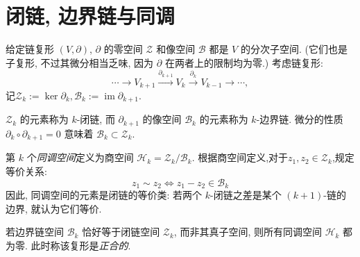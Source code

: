 \section{闭链, 边界链与同调}\label{sec:cycles-boundaries-homology}

给定链复形 $(V,\partial)$, $\partial$ 的零空间 $\mathcal Z$ 和像空间 $\mathcal B$ 都是 $V$ 的分次子空间. (它们也是子复形, 不过其微分相当乏味, 因为 $\partial$ 在两者上的限制均为零.) 
考虑链复形:
\[
\cdots\to V_{k+1}\xrightarrow{\partial_{k+1}}V_k\xrightarrow{\partial_k}V_{k-1}\to\cdots,
\]
记$\mathcal Z_k:=\ker \partial_{k},\mathcal B_k:=\operatorname{im}\partial_{k+1}$.

$\mathcal Z_k$ 的元素称为 $k$-闭链, 而 $\partial_{k+1}$ 的像空间 $\mathcal B_k$ 的元素称为 $k$-边界链. 微分的性质 $\partial_{k}\circ\partial_{k+1}=0$ 意味着 $\mathcal B_k\subset\mathcal Z_k$.

第 $k$ 个\emph{同调空间}定义为商空间 $\mathcal H_k=\mathcal Z_k/\mathcal B_k$. 根据商空间定义,对于$z_1,z_2\in \mathcal{Z}_k$,规定等价关系:
$$
z_1\sim z_2 \Longleftrightarrow z_1-z_2\in \mathcal B_k
$$
因此, 同调空间的元素是闭链的等价类: 若两个 $k$-闭链之差是某个 $(k+1)$-链的边界, 就认为它们等价. 

若边界链空间 $\mathcal B_k$ 恰好等于闭链空间 $\mathcal Z_k$, 而非其真子空间, 则所有同调空间 $\mathcal H_k$ 都为零. 此时称该复形是\emph{正合的}.
